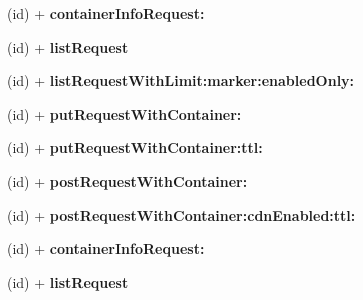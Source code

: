 \begin{DoxyCompactItemize}
\item 
\hypertarget{interface_a_s_i_cloud_files_c_d_n_request_a7530647efafef518b550f6390b6b4c30}{
(id) + {\bfseries container\-Info\-Request\-:}}
\label{interface_a_s_i_cloud_files_c_d_n_request_a7530647efafef518b550f6390b6b4c30}

\item 
\hypertarget{interface_a_s_i_cloud_files_c_d_n_request_a9d7f472b708be8a5bbff26ecf72ca0e7}{
(id) + {\bfseries list\-Request}}
\label{interface_a_s_i_cloud_files_c_d_n_request_a9d7f472b708be8a5bbff26ecf72ca0e7}

\item 
\hypertarget{interface_a_s_i_cloud_files_c_d_n_request_a3acbf036c7e416c2b6f66ac6be6a9617}{
(id) + {\bfseries list\-Request\-With\-Limit\-:marker\-:enabled\-Only\-:}}
\label{interface_a_s_i_cloud_files_c_d_n_request_a3acbf036c7e416c2b6f66ac6be6a9617}

\item 
\hypertarget{interface_a_s_i_cloud_files_c_d_n_request_a92d1b9ce687974a8ffab0b026a39eb28}{
(id) + {\bfseries put\-Request\-With\-Container\-:}}
\label{interface_a_s_i_cloud_files_c_d_n_request_a92d1b9ce687974a8ffab0b026a39eb28}

\item 
\hypertarget{interface_a_s_i_cloud_files_c_d_n_request_ab7db6c10a48bfb16bdae65e5d7740148}{
(id) + {\bfseries put\-Request\-With\-Container\-:ttl\-:}}
\label{interface_a_s_i_cloud_files_c_d_n_request_ab7db6c10a48bfb16bdae65e5d7740148}

\item 
\hypertarget{interface_a_s_i_cloud_files_c_d_n_request_aa201c29194b1b8465c6b45a582904573}{
(id) + {\bfseries post\-Request\-With\-Container\-:}}
\label{interface_a_s_i_cloud_files_c_d_n_request_aa201c29194b1b8465c6b45a582904573}

\item 
\hypertarget{interface_a_s_i_cloud_files_c_d_n_request_adc0b232663fe13af064f00522d6da305}{
(id) + {\bfseries post\-Request\-With\-Container\-:cdn\-Enabled\-:ttl\-:}}
\label{interface_a_s_i_cloud_files_c_d_n_request_adc0b232663fe13af064f00522d6da305}

\item 
\hypertarget{interface_a_s_i_cloud_files_c_d_n_request_a7530647efafef518b550f6390b6b4c30}{
(id) + {\bfseries container\-Info\-Request\-:}}
\label{interface_a_s_i_cloud_files_c_d_n_request_a7530647efafef518b550f6390b6b4c30}

\item 
\hypertarget{interface_a_s_i_cloud_files_c_d_n_request_a9d7f472b708be8a5bbff26ecf72ca0e7}{
(id) + {\bfseries list\-Request}}
\label{interface_a_s_i_cloud_files_c_d_n_request_a9d7f472b708be8a5bbff26ecf72ca0e7}


\end{DoxyCompactItemize}
